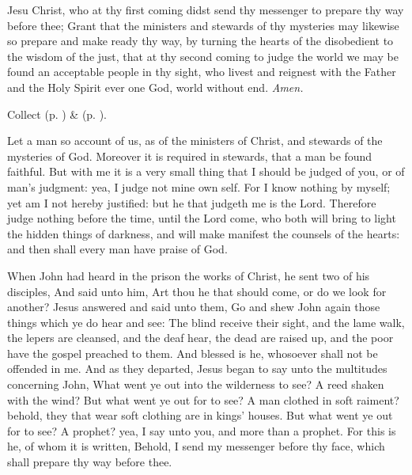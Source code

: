  Jesu Christ, who at thy first coming didst send thy messenger to prepare thy way before thee; Grant that the ministers and stewards of thy mysteries may likewise so prepare and make ready thy way, by turning the hearts of the disobedient to the wisdom of the just, that at thy second coming to judge the world we may be found an acceptable people in thy sight, who livest and reignest with the Father and the Holy Spirit ever one God, world without end. \textit{Amen.}

\begin{rubric}
     Collect  (p. \pageref{AdventICollect}) \&   (p. \pageref{SPMaryInAdvent}).
\end{rubric}

\vspace{-0.2\baselineskip}


\vspace{-0.13\baselineskip}

 Let a man so account of us, as of the ministers of Christ, and stewards of the mysteries of God. Moreover it is required in stewards, that a man be found faithful. But with me it is a very small thing that I should be judged of you, or of man's judgment: yea, I judge not mine own self. For I know nothing by myself; yet am I not hereby justified: but he that judgeth me is the Lord. Therefore judge nothing before the time, until the Lord come, who both will bring to light the hidden things of darkness, and will make manifest the counsels of the hearts: and then shall every man have praise of God.


 When John had heard in the prison the works of Christ, he sent two of his disciples, And said unto him, Art thou he that should come, or do we look for another? Jesus answered and said unto them, Go and shew John again those things which ye do hear and see: The blind receive their sight, and the lame walk, the lepers are cleansed, and the deaf hear, the dead are raised up, and the poor have the gospel preached to them. And blessed is he, whosoever shall not be offended in me. And as they departed, Jesus began to say unto the multitudes concerning John, What went ye out into the wilderness to see? A reed shaken with the wind? But what went ye out for to see? A man clothed in soft raiment? behold, they that wear soft clothing are in kings' houses. But what went ye out for to see? A prophet? yea, I say unto you, and more than a prophet. For this is he, of whom it is written, Behold, I send my messenger before thy face, which shall prepare thy way before thee.

